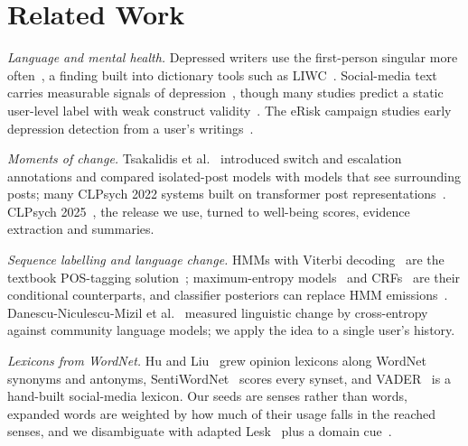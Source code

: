 \documentclass[conference]{IEEEtran}
\begin{document}
\section{Related Work}

\emph{Language and mental health.} Depressed writers use the first-person singular more often~\cite{rude2004language}, a finding built into dictionary tools such as LIWC~\cite{tausczik2010psychological}. Social-media text carries measurable signals of depression~\cite{dechoudhury2013predicting,coppersmith2014quantifying}, though many studies predict a static user-level label with weak construct validity~\cite{chancellor2020methods}. The eRisk campaign studies early depression detection from a user's writings~\cite{losada2016test,parapar2024erisk}.

\emph{Moments of change.} Tsakalidis et al.~\cite{tsakalidis2022identifying} introduced switch and escalation annotations and compared isolated-post models with models that see surrounding posts; many CLPsych 2022 systems built on transformer post representations~\cite{tsakalidis2022overview}. CLPsych 2025~\cite{tseriotou2025overview}, the release we use, turned to well-being scores, evidence extraction and summaries.

\emph{Sequence labelling and language change.} HMMs with Viterbi decoding~\cite{rabiner1989tutorial,viterbi1967error} are the textbook POS-tagging solution~\cite{brants2000tnt}; maximum-entropy models~\cite{berger1996maximum} and CRFs~\cite{lafferty2001conditional} are their conditional counterparts, and classifier posteriors can replace HMM emissions~\cite{bourlard1994connectionist}. Danescu-Niculescu-Mizil et al.~\cite{danescu2013no} measured linguistic change by cross-entropy against community language models; we apply the idea to a single user's history.

\emph{Lexicons from WordNet.} Hu and Liu~\cite{hu2004mining} grew opinion lexicons along WordNet synonyms and antonyms, SentiWordNet~\cite{esuli2006sentiwordnet} scores every synset, and VADER~\cite{hutto2014vader} is a hand-built social-media lexicon. Our seeds are senses rather than words, expanded words are weighted by how much of their usage falls in the reached senses, and we disambiguate with adapted Lesk~\cite{lesk1986automatic,banerjee2002adapted} plus a domain cue~\cite{magnini2002role}.

\end{document}
